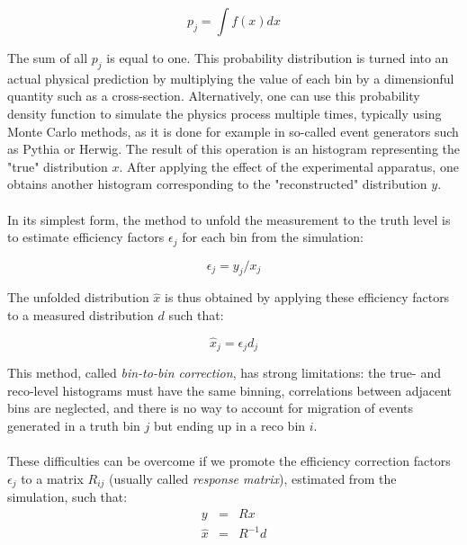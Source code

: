 \documentclass{article}
\begin{document}
\begin{equation}
    p_j = \int f(x)dx
\end{equation}

The sum of all $p_j$ is equal to one. This probability distribution is turned into an actual physical prediction by multiplying the value of each bin by a dimensionful quantity such as a cross-section. Alternatively, one can use this probability density function to simulate the physics process multiple times, typically using Monte Carlo methods, as it is done for example in so-called event generators such as Pythia\cite{Pythia8} or Herwig\cite{Herwig7}. The result of this operation is an histogram representing the "true" distribution $x$. After applying the effect of the experimental apparatus, one obtains another histogram corresponding to the "reconstructed" distribution $y$. 

\paragraph{}
In its simplest form, the method to unfold the measurement to the truth level is to estimate efficiency factors $\epsilon_j$ for each bin from the simulation:

\begin{equation}
  \epsilon_j =  y_j / x_j
\end{equation}

The unfolded distribution $\hat{x}$ is thus obtained by applying these efficiency factors to a measured distribution $d$ such that:

\begin{equation}
    \hat{x}_j = \epsilon_j d_j
\end{equation}

This method, called {\sl bin-to-bin correction}, has strong limitations: the true- and reco-level histograms must have the same binning, correlations between adjacent bins are neglected, and there is no way to account for migration of events generated in a truth bin $j$ but ending up in a reco bin $i$. 

\paragraph{}
These difficulties can be overcome if we promote the efficiency correction factors $\epsilon_j$ to a matrix $R_{ij}$ (usually called {\sl response matrix}), estimated from the simulation, such that:
\begin{eqnarray}
    y & = & Rx\\
    \hat{x} &=& R^{-1}d \label{eq:unreg_unfolding} 
\end{eqnarray}
\end{document}
